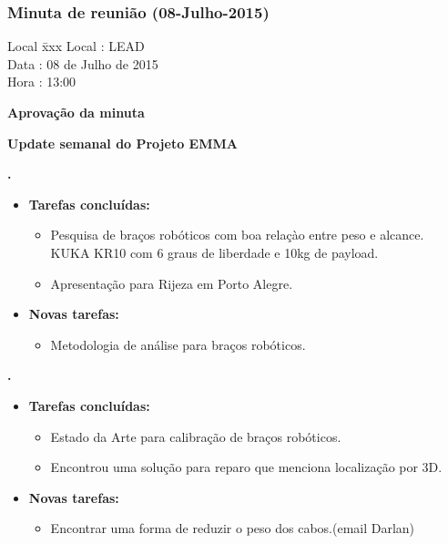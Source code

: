 \subsubsection{Minuta de reunião (08-Julho-2015)}

\begin{tabbing}
  Local \= xxx \kill
  Local \> : LEAD \\
  Data  \> : 08 de Julho de 2015 \\
  Hora  \> : 13:00
\end{tabbing}


\textbf{Aprovação da minuta}

\textbf{Update semanal do Projeto EMMA}

  
\textbf{\renan.} 
	\begin{itemize}
		\item \textbf{Tarefas concluídas:}
			\begin{itemize}    
				\item Pesquisa de braços robóticos com boa relaçào entre peso e alcance.
				KUKA KR10 com 6 graus de liberdade e 10kg de payload.
				\item Apresentação para Rijeza em Porto Alegre.
			\end{itemize}
		
		\item \textbf{Novas tarefas:}
			\begin{itemize} 
				\item Metodologia de análise para braços robóticos.
			\end{itemize}
	\end{itemize}
		
\textbf{\elael.} 
	\begin{itemize}
		\item \textbf{Tarefas concluídas:}
			\begin{itemize}    
				\item Estado da Arte para calibração de braços robóticos.
				\item Encontrou uma solução para reparo que menciona localização por 3D. 
			\end{itemize}
		
		\item \textbf{Novas tarefas:}
			\begin{itemize} 
				\item Encontrar uma forma de reduzir o peso dos cabos.(email Darlan)
			\end{itemize}
	\end{itemize}
					
